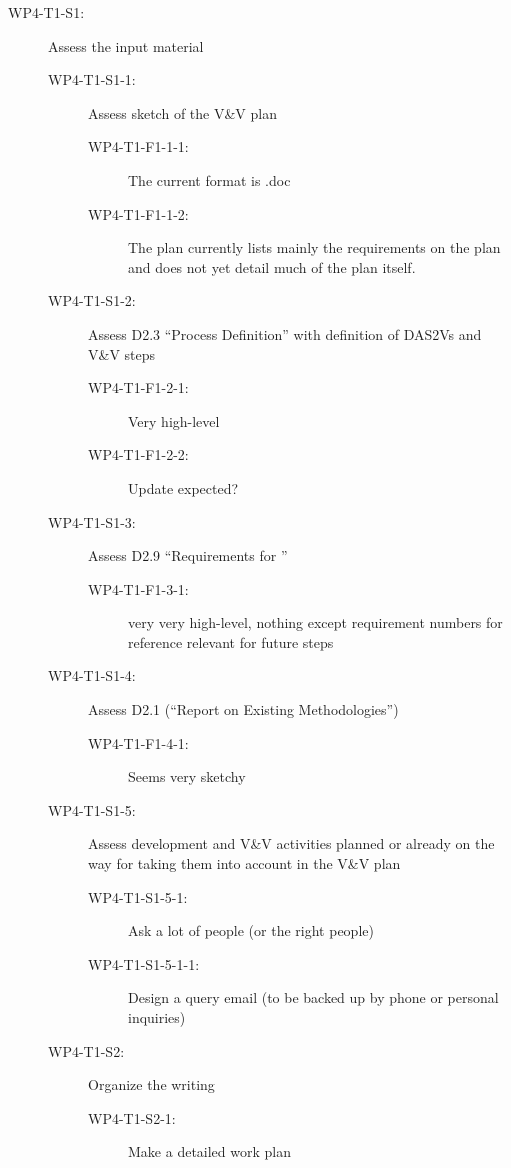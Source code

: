 \begin{description}
\item[WP4-T1-S1:] Assess the input material
  \begin{description}
  \item[WP4-T1-S1-1:] Assess sketch of the V\&V plan
    \begin{description}
    \item[WP4-T1-F1-1-1:] The current format is .doc
    \item[WP4-T1-F1-1-2:] The plan currently lists mainly the requirements
      on the plan and does not yet detail much of the plan itself.
    \end{description}
  \item[WP4-T1-S1-2:] Assess D2.3 ``Process Definition'' with
    definition of DAS2Vs and V\&V steps
    \begin{description}
    \item[WP4-T1-F1-2-1:] Very high-level
    \item[WP4-T1-F1-2-2:] Update expected?
    \end{description}
  \item[WP4-T1-S1-3:] Assess D2.9 ``Requirements for \VV''
    \begin{description}
    \item[WP4-T1-F1-3-1:] very very high-level, nothing except requirement
      numbers for reference relevant for future steps 
    \end{description}
  \item[WP4-T1-S1-4:] Assess D2.1 (``Report on Existing Methodologies'')
    \begin{description}
    \item[WP4-T1-F1-4-1:] Seems very sketchy
    \end{description}
  \item[WP4-T1-S1-5:] Assess development and V\&V activities planned or
    already on the way for taking them into account in the V\&V plan 
    \begin{description}
    \item[WP4-T1-S1-5-1:] Ask a lot of people (or the right people)
    \item[WP4-T1-S1-5-1-1:] Design a query email (to be backed up by
      phone or personal inquiries) 
    \end{description}
  \item[WP4-T1-S2:] Organize the writing 
    \begin{description}
    \item[WP4-T1-S2-1:] Make a detailed work plan

\end{description}
\end{description}
\end{description}
